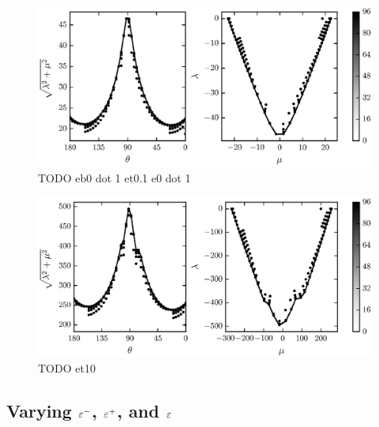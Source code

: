 	\begin{figure}
		\begin{center}
			\includegraphics{./fig/ch3/pull/eb0.1_et0.1_e0.1/grid.eps}
		\end{center}		
		\caption{ TODO eb0 dot 1 et0.1 e0 dot 1
		\label{fig:PullGrid:eb0.1_et0.1_e0.1}}
	\end{figure}
	
	\begin{figure}
		\begin{center}
			\includegraphics{./fig/ch3/pull/et10/grid.eps}
		\end{center}		
		\caption{ TODO et10
		\label{fig:PullGrid:et10}}
	\end{figure}

\subsection{Varying $\varepsilon^-$, $\varepsilon^+$, and $\varepsilon$} \label{section:detachment:eps}

